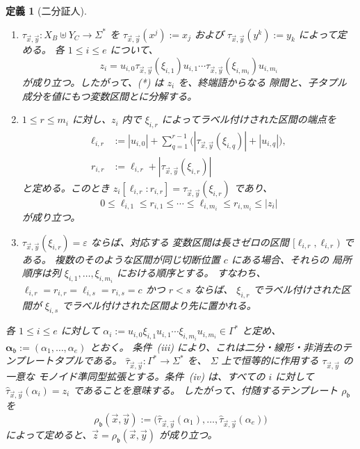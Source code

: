 \documentclass[11pt,a4paper]{ltjsarticle}
\newtheorem{definition}[theorem]{定義}
\theoremstyle{remark}
\newcommand{\tuple}[1]{\vec{#1}}
\newcommand{\eps}{\varepsilon}
\begin{document}
\begin{definition}[二分証人]
\begin{enumerate}[label=(\roman*),leftmargin=*]
\item \(\tau_{\tuple x,\tuple y}:X_B\uplus Y_C\to\Sigma^*\) を
      \(\tau_{\tuple x,\tuple y}(x^j):=x_j\) および
      \(\tau_{\tuple x,\tuple y}(y^k):=y_k\) によって定める。
      各 \(1\le i\le e\) について、
      \[
        z_i=u_{i,0}\tau_{\tuple x,\tuple y}(\xi_{i,1})u_{i,1}\cdots
        \tau_{\tuple x,\tuple y}(\xi_{i,m_i})u_{i,m_i}
        \tag{*}
      \]
      が成り立つ。したがって、\textup{(*)} は \(z_i\) を、終端語からなる
      隙間と、子タプル成分を値にもつ変数区間とに分解する。

\item \(1\le r\le m_i\) に対し、\(z_i\) 内で
      \(\xi_{i,r}\) によってラベル付けされた区間の端点を
      \[
      \begin{aligned}
        \ell_{i,r}
        &:={}|u_{i,0}|+\sum_{q=1}^{r-1}
        \bigl(|\tau_{\tuple x,\tuple y}(\xi_{i,q})|+|u_{i,q}|\bigr),\\
        r_{i,r}
        &:={\ell_{i,r}}+|\tau_{\tuple x,\tuple y}(\xi_{i,r})|
      \end{aligned}
      \]
      と定める。このとき
      \(z_i[\ell_{i,r}:r_{i,r}]=\tau_{\tuple x,\tuple y}(\xi_{i,r})\) であり、
      \[
        0\le\ell_{i,1}\le r_{i,1}\le\cdots\le
        \ell_{i,m_i}\le r_{i,m_i}\le|z_i|
      \]
      が成り立つ。

\item \(\tau_{\tuple x,\tuple y}(\xi_{i,r})=\eps\) ならば、対応する
      変数区間は長さゼロの区間 \([\ell_{i,r},\ell_{i,r})\) である。
      複数のそのような区間が同じ切断位置 \(c\) にある場合、それらの
      局所順序は列 \(\xi_{i,1},\ldots,\xi_{i,m_i}\) における順序とする。
      すなわち、
      \(\ell_{i,r}=r_{i,r}=\ell_{i,s}=r_{i,s}=c\) かつ \(r<s\) ならば、
      \(\xi_{i,r}\) でラベル付けされた区間が
      \(\xi_{i,s}\) でラベル付けされた区間より先に置かれる。
\end{enumerate}

各 \(1\le i\le e\) に対して
\(\alpha_i:=u_{i,0}\xi_{i,1}u_{i,1}\cdots
\xi_{i,m_i}u_{i,m_i}\in\Gamma^*\) と定め、
\(\boldsymbol\alpha_{\mathfrak b}:=(\alpha_1,\ldots,\alpha_e)\) とおく。
条件~(iii) により、これは二分・線形・非消去のテンプレートタプルである。
\(\widehat\tau_{\tuple x,\tuple y}:\Gamma^*\to\Sigma^*\) を、
\(\Sigma\) 上で恒等的に作用する \(\tau_{\tuple x,\tuple y}\) の一意な
モノイド準同型拡張とする。条件~(iv) は、すべての \(i\) に対して
\(\widehat\tau_{\tuple x,\tuple y}(\alpha_i)=z_i\) であることを意味する。
したがって、付随するテンプレート \(\rho_{\mathfrak b}\) を
\[
  \rho_{\mathfrak b}(\tuple x,\tuple y):=
  \bigl(\widehat\tau_{\tuple x,\tuple y}(\alpha_1),\ldots,
        \widehat\tau_{\tuple x,\tuple y}(\alpha_e)\bigr)
\]
によって定めると、\(\tuple z=\rho_{\mathfrak b}(\tuple x,\tuple y)\) が成り立つ。
\end{definition}
\end{document}
